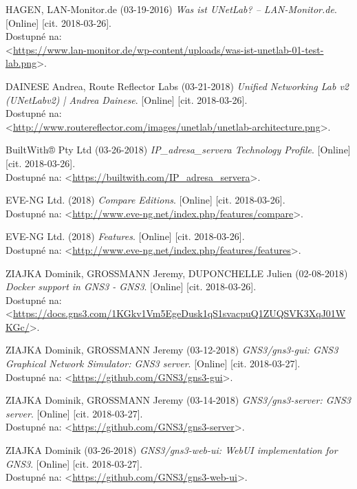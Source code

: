 \begin{thebibliography}{99}
HAGEN, LAN-Monitor.de  (03-19-2016) {\it Was ist UNetLab? – LAN-Monitor.de}. [Online] [cit. 2018-03-26]. \\
Dostupné na: \\
<\url{https://www.lan-monitor.de/wp-content/uploads/was-ist-unetlab-01-test-lab.png}>.

DAINESE Andrea, Route Reflector Labs (03-21-2018) {\it Unified Networking Lab v2 (UNetLabv2) | Andrea Dainese}. [Online] [cit. 2018-03-26]. \\
Dostupné na: \\
<\url{http://www.routereflector.com/images/unetlab/unetlab-architecture.png}>.

BuiltWith® Pty Ltd (03-26-2018) {\it IP\_adresa\_servera Technology Profile}. [Online] [cit. 2018-03-26]. \\
Dostupné na: <\url{https://builtwith.com/IP\_adresa\_servera}>.

EVE-NG Ltd. (2018) {\it Compare Editions}. [Online] [cit. 2018-03-26]. \\
Dostupné na: <\url{http://www.eve-ng.net/index.php/features/compare}>.

EVE-NG Ltd. (2018) {\it Features}. [Online] [cit. 2018-03-26]. \\
Dostupné na: <\url{http://www.eve-ng.net/index.php/features/features}>.

ZIAJKA Dominik, GROSSMANN Jeremy, DUPONCHELLE Julien (02-08-2018) {\it Docker support in GNS3 - GNS3}. [Online] [cit. 2018-03-26]. \\
Dostupné na: \\
<\url{https://docs.gns3.com/1KGkv1Vm5EgeDusk1qS1svacpuQ1ZUQSVK3XqJ01WKGc/}>.

ZIAJKA Dominik, GROSSMANN Jeremy (03-12-2018) {\it GNS3/gns3-gui: GNS3 Graphical Network Simulator: GNS3 server}. [Online] [cit. 2018-03-27]. \\
Dostupné na: <\url{https://github.com/GNS3/gns3-gui}>.

ZIAJKA Dominik, GROSSMANN Jeremy (03-14-2018) {\it GNS3/gns3-server: GNS3 server}. [Online] [cit. 2018-03-27]. \\
Dostupné na: <\url{https://github.com/GNS3/gns3-server}>.

ZIAJKA Dominik (03-26-2018) {\it GNS3/gns3-web-ui: WebUI implementation for GNS3}. [Online] [cit. 2018-03-27]. \\
Dostupné na: <\url{https://github.com/GNS3/gns3-web-ui}>.


\end{thebibliography}

